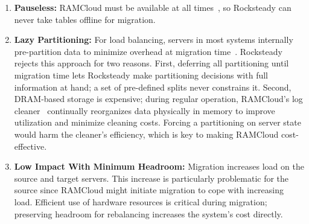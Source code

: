 \begin{enumerate}
\item {\bf Pauseless:}
RAMCloud must be available at all times~\cite{ramcloud-recovery}, so
Rocksteady can never take tables offline for migration.

\item {\bf Lazy Partitioning:}
For load balancing, servers in most systems
internally pre-partition data
to minimize overhead at migration time~\cite{dynamo,farm-2014}.
Rocksteady rejects this approach for two reasons. First, deferring all
partitioning until migration time lets Rocksteady make partitioning
decisions with full information at hand; a set
of pre-defined splits never constrains it. Second, DRAM-based storage is
expensive; during
regular operation, RAMCloud's log cleaner~\cite{ramcloud-lsm}
continually
reorganizes data physically in memory to improve utilization and
minimize cleaning costs. Forcing a partitioning on server state
would harm the cleaner's efficiency, which is key to making RAMCloud
cost-effective.

\item {\bf Low Impact With Minimum Headroom:}
Migration increases load on the source and target servers. This increase
is particularly
problematic for the source since RAMCloud might initiate migration to cope with
increasing load. Efficient use of hardware resources is critical during
migration; preserving headroom for rebalancing increases the
system's cost directly.

\end{enumerate}


